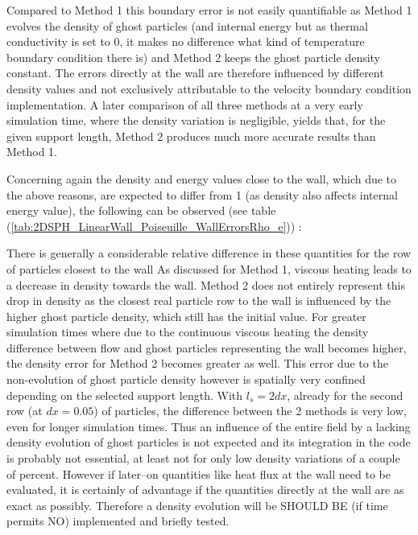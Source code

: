 \documentclass[11pt,a4paper,twoside]{report}
\begin{document}
Compared to Method 1 this boundary error is not easily quantifiable as Method 1 evolves the density of ghost particles (and internal energy but as thermal conductivity is set to 0, it makes no difference what kind of temperature boundary condition there is) and Method 2 keeps the ghost particle density constant. The errors directly at the wall are therefore influenced by different density values and not exclusively attributable to the velocity boundary condition implementation. A later comparison of all three methods at a very early simulation time, where the density variation is negligible, yields that, for the given support length, Method 2 produces much more accurate results than Method 1. 

Concerning again the density and energy values close to the wall, which due to the above reasons, are expected to differ from 1 (as density also affects internal energy value), the following can be observed (see table (\ref{tab:2DSPH_LinearWall_Poiseuille_WallErrorsRho_e})) : 

There is generally a considerable relative difference in these quantities for the row of particles closest to the wall %
As discussed for Method 1, viscous heating leads to a decrease in density towards the wall. Method 2 does not entirely represent this drop in density as the closest real particle row to the wall is influenced by the higher ghost particle density, which still has the initial value. For greater simulation times where due to the continuous viscous heating the density difference between flow and ghost particles representing the wall becomes higher, the density error for Method 2 becomes greater as well. 
This error due to the non-evolution of ghost particle density however is spatially very confined depending on the selected support length. With $l_s=2dx$, already for the second row (at $dx=0.05$) of particles, the difference between the 2 methods is very low, even for longer simulation times.
Thus an influence of the entire field by a lacking density evolution of ghost particles is not expected and its integration in the code is probably not essential, at least not for only low density variations of a couple of percent. However if later--on quantities like heat flux at the wall need to be evaluated, it is certainly of advantage if the quantities directly at the wall are as exact as possibly. Therefore a density evolution will be SHOULD BE (if time permits NO) implemented and briefly tested.
\end{document}
